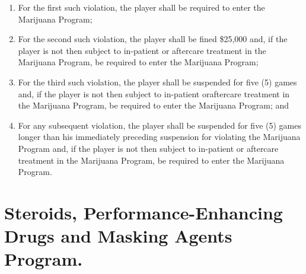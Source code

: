 \documentclass[
]{book}
\providecommand{\tightlist}{%
  \setlength{\itemsep}{0pt}\setlength{\parskip}{0pt}}
\begin{document}
\begin{enumerate}
  \begin{enumerate}
  \def\labelenumii{(\Alph{enumii})}
  \tightlist
  \item
    For the first such violation, the player shall be required to enter the Marijuana Program;
  \item
    For the second such violation, the player shall be fined \$25,000 and, if the player is not then subject to in-patient or aftercare treatment in the Marijuana Program, be required to enter the Marijuana Program;
  \item
    For the third such violation, the player shall be suspended for five (5) games and, if the player is not then subject to in-patient oraftercare treatment in the Marijuana Program, be required to enter the Marijuana Program; and
  \item
    For any subsequent violation, the player shall be suspended for five (5) games longer than his immediately preceding suspension for violating the Marijuana Program and, if the player is not then subject to in-patient or aftercare treatment in the Marijuana Program, be required to enter the Marijuana Program.
  \end{enumerate}
\end{enumerate}

\hypertarget{steroids-performance-enhancing-drugs-and-masking-agents-program.}{%
\section{Steroids, Performance-Enhancing Drugs and Masking Agents Program.}\label{steroids-performance-enhancing-drugs-and-masking-agents-program.}}
\end{document}
